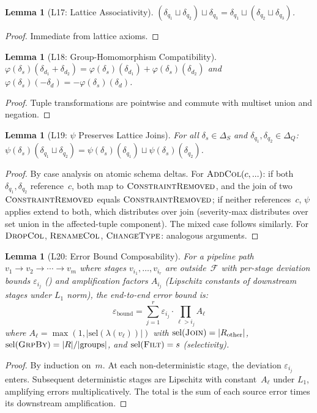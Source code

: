 \documentclass[11pt,a4paper]{article}
\newtheorem{lemma}[theorem]{Lemma}
\theoremstyle{definition}
\newcommand{\DeltaS}{\Delta_{\!S}}
\newcommand{\DeltaQ}{\Delta_{\!Q}}
\newcommand{\FragF}{\mathcal{F}}
\newcommand{\ebound}{\varepsilon_{\mathrm{bound}}}
\begin{document}
\begin{lemma}[L17: Lattice Associativity]\label{lem:lattice-assoc}
$(\delta_{q_1} \sqcup \delta_{q_2}) \sqcup \delta_{q_3} =
 \delta_{q_1} \sqcup (\delta_{q_2} \sqcup \delta_{q_3})$.
\end{lemma}
\begin{proof}
Immediate from lattice axioms.
\end{proof}

\begin{lemma}[L18: Group-Homomorphism Compatibility]\label{lem:group-homo}
$\varphi(\delta_s)(\delta_{d_1} + \delta_{d_2}) =
 \varphi(\delta_s)(\delta_{d_1}) + \varphi(\delta_s)(\delta_{d_2})$
and $\varphi(\delta_s)(-\delta_d) = -\varphi(\delta_s)(\delta_d)$.
\end{lemma}
\begin{proof}
Tuple transformations are pointwise and commute with multiset union and
negation.
\end{proof}

\begin{lemma}[L19: $\psi$ Preserves Lattice Joins]\label{lem:psi-join}
For all $\delta_s \in \DeltaS$ and $\delta_{q_1}, \delta_{q_2} \in \DeltaQ$:
$\psi(\delta_s)(\delta_{q_1} \sqcup \delta_{q_2}) =
 \psi(\delta_s)(\delta_{q_1}) \sqcup \psi(\delta_s)(\delta_{q_2})$.
\end{lemma}
\begin{proof}
By case analysis on atomic schema deltas.  For $\textsc{AddCol}(c,...)$:
if both $\delta_{q_1}, \delta_{q_2}$ reference~$c$, both map to
$\textsc{ConstraintRemoved}$, and the join of two $\textsc{ConstraintRemoved}$
equals $\textsc{ConstraintRemoved}$;
if neither references~$c$, $\psi$ applies $\mathrm{extend}$ to both, which
distributes over join (severity-max distributes over set union in the
affected-tuple component).
The mixed case follows similarly.  For $\textsc{DropCol}$, $\textsc{RenameCol}$,
$\textsc{ChangeType}$: analogous arguments.
\end{proof}

\begin{lemma}[L20: Error Bound Composability]\label{lem:error-compose}
For a pipeline path $v_1 \to v_2 \to \cdots \to v_m$ where stages
$v_{i_1}, \ldots, v_{i_r}$ are outside~$\FragF$ with per-stage deviation
bounds $\varepsilon_{i_j}$ () and amplification factors
$A_{i_j}$ (Lipschitz constants of downstream stages under $L_1$ norm), the
end-to-end error bound is:
\[
\ebound = \sum_{j=1}^{r} \varepsilon_{i_j} \cdot \prod_{\ell > i_j} A_\ell
\]
where $A_\ell = \max(1, |\mathrm{sel}(\lambda(v_\ell))|)$ with
$\mathrm{sel}(\textsc{Join}) = |R_{\mathrm{other}}|$,
$\mathrm{sel}(\textsc{GrpBy}) = |R|/|\mathrm{groups}|$, and
$\mathrm{sel}(\textsc{Filt}) = s$ (selectivity).
\end{lemma}
\begin{proof}
By induction on~$m$.  At each non-deterministic stage, the deviation
$\varepsilon_{i_j}$ enters.  Subsequent deterministic stages are Lipschitz
with constant~$A_\ell$ under $L_1$, amplifying errors multiplicatively.
The total is the sum of each source error times its downstream amplification.
\end{proof}
\end{document}

